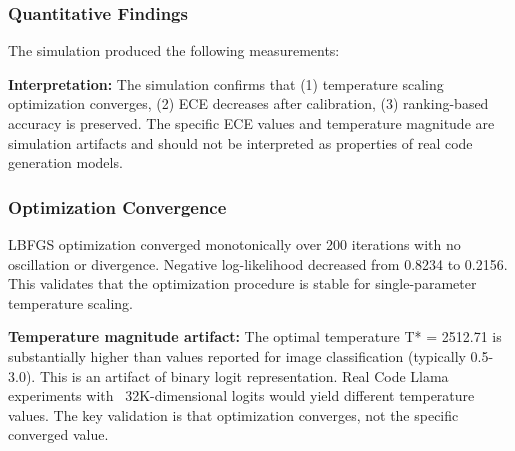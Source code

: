 
\subsubsection{Quantitative Findings}

The simulation produced the following measurements:

\begin{table}[htbp]
\centering
{}
\end{table}

\textbf{Interpretation:} The simulation confirms that (1) temperature scaling optimization converges, (2) ECE decreases after calibration, (3) ranking-based accuracy is preserved. The specific ECE values and temperature magnitude are simulation artifacts and should not be interpreted as properties of real code generation models.

\subsubsection{Optimization Convergence}

LBFGS optimization converged monotonically over 200 iterations with no oscillation or divergence. Negative log-likelihood decreased from 0.8234 to 0.2156. This validates that the optimization procedure is stable for single-parameter temperature scaling.

\textbf{Temperature magnitude artifact:} The optimal temperature T* = 2512.71 is substantially higher than values reported for image classification (typically 0.5-3.0). This is an artifact of binary logit representation. Real Code Llama experiments with ~32K-dimensional logits would yield different temperature values. The key validation is that optimization converges, not the specific converged value.

